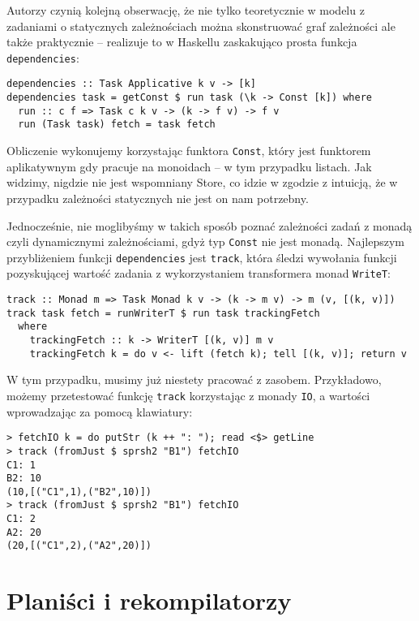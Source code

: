 Autorzy czynią kolejną obserwację, że nie tylko teoretycznie w modelu z zadaniami o statycznych zależnościach można skonstruować graf zależności ale także praktycznie -- realizuje to w Haskellu zaskakująco prosta funkcja \lstinline{dependencies}:

\begin{lstlisting}
dependencies :: Task Applicative k v -> [k]
dependencies task = getConst $ run task (\k -> Const [k]) where
  run :: c f => Task c k v -> (k -> f v) -> f v
  run (Task task) fetch = task fetch
\end{lstlisting}

Obliczenie wykonujemy korzystając funktora \lstinline{Const}, który jest funktorem aplikatywnym gdy pracuje na monoidach -- w tym przypadku listach. Jak widzimy, nigdzie nie jest wspomniany Store, co idzie w zgodzie z intuicją, że w przypadku zależności statycznych nie jest on nam potrzebny.

Jednocześnie, nie moglibyśmy w takich sposób poznać zależności zadań z monadą czyli dynamicznymi zależnościami, gdyż typ \lstinline{Const} nie jest monadą. Najlepszym przybliżeniem funkcji \lstinline{dependencies} jest \lstinline{track}, która śledzi wywołania funkcji pozyskującej wartość zadania z wykorzystaniem transformera monad \lstinline{WriteT}:

\begin{lstlisting}
track :: Monad m => Task Monad k v -> (k -> m v) -> m (v, [(k, v)])
track task fetch = runWriterT $ run task trackingFetch
  where
    trackingFetch :: k -> WriterT [(k, v)] m v
    trackingFetch k = do v <- lift (fetch k); tell [(k, v)]; return v
\end{lstlisting}

W tym przypadku, musimy już niestety pracować z zasobem. Przykładowo, możemy przetestować funkcję \lstinline{track} korzystając z monady \lstinline{IO}, a wartości wprowadzając za pomocą klawiatury:

\begin{lstlisting}
> fetchIO k = do putStr (k ++ ": "); read <$> getLine
> track (fromJust $ sprsh2 "B1") fetchIO
C1: 1
B2: 10
(10,[("C1",1),("B2",10)])
> track (fromJust $ sprsh2 "B1") fetchIO
C1: 2
A2: 20
(20,[("C1",2),("A2",20)])

\end{lstlisting}

\section{Planiści i rekompilatorzy}

